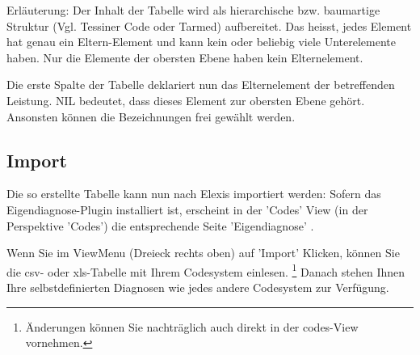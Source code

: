 \documentclass[a4paper]{scrartcl}
\begin{document}
\medskip

Erläuterung: Der Inhalt der Tabelle wird als hierarchische bzw. baumartige Struktur (Vgl. Tessiner Code oder Tarmed) aufbereitet. Das heisst, jedes Element hat genau ein Eltern-Element und kann kein oder beliebig viele Unterelemente haben. Nur die Elemente der obersten Ebene haben kein Elternelement.

Die erste Spalte der Tabelle deklariert nun das Elternelement der betreffenden Leistung. NIL bedeutet, dass dieses Element zur obersten Ebene gehört. Ansonsten können die Bezeichnungen frei gewählt werden.

\subsection{Import}
Die so erstellte Tabelle kann nun nach Elexis importiert werden: Sofern das Eigendiagnose-Plugin installiert ist, erscheint in der 'Codes' View (in der Perspektive 'Codes') die entsprechende Seite 'Eigendiagnose' .

Wenn Sie im ViewMenu (Dreieck rechts oben) auf 'Import' Klicken, können Sie die csv- oder xls-Tabelle mit Ihrem Codesystem einlesen. \footnote{Änderungen können Sie nachträglich auch direkt in der codes-View vornehmen.} Danach stehen Ihnen Ihre selbstdefinierten Diagnosen wie jedes andere Codesystem zur Verfügung.
\end{document}
